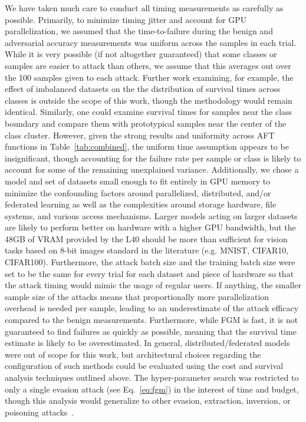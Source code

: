 \documentclass[conference]{IEEEtran}
\begin{document}
{We have taken much care to conduct all timing measurements as carefully as possible.
Primarily, to minimize timing jitter and account for GPU parallelization, we assumed that the time-to-failure during the benign and adversarial accuracy measurements was uniform across the samples in each trial. 
While it is very possible (if not altogether guaranteed) that some classes or samples are easier to attack than others, we assume that this averages out over the 100 samples given to each attack. Further work examining, for example, the effect of imbalanced datasets on the the distribution of survival times across classes is outside the scope of this work, though the methodology would remain identical. Similarly, one could examine survival times for samples near the class boundary and compare them with prototypical samples near the center of the class cluster. 
However, given the strong results and uniformity across AFT functions in Table~\ref{tab:combined}, the uniform time assumption appears to be insignificant, though accounting for the failure rate per sample or class is likely to account for some of the remaining unexplained variance. 
Additionally, we chose a model and set of datasets small enough to fit entirely in GPU memory to minimize the confounding factors around parallelized, distributed, and/or federated learning as well as the complexities around storage hardware, file systems, and various access mechanisms. 
Larger models acting on larger datasets are likely to perform better on hardware with a higher GPU bandwidth, but the 48GB of VRAM provided by the L40 should be more than sufficient for vision tasks based on 8-bit images standard in the literature (e.g. MNIST, CIFAR10, CIFAR100). Furthermore, the attack batch size and the training batch size were set to be the same for every trial for each dataset and piece of hardware so that the attack timing would mimic the usage of regular users.
If anything, the smaller sample size of the attacks means that proportionally more parallelization overhead is needed per sample, leading to an underestimate of the attack efficacy compared to the benign measurements. Furthermore, while FGM is fast, it is not guaranteed to find failures as quickly as possible, meaning that the survival time estimate is likely to be overestimated.
In general, distributed/federated models were out of scope for this work, but architectural choices regarding the configuration of such methods could be evaluated using the cost and survival analysis techniques outlined above. 
The hyper-parameter search was restricted to only a single evasion attack (see Eq.~\ref{eq:fgm}) in the interest of time and budget, though this analysis would generalize to other evasion, extraction, inversion, or poisoning attacks~\cite{biggio_evasion_2013,biggio_poisoning_2013,choquette2021label,orekondy2019knockoff}. 


}
\end{document}
